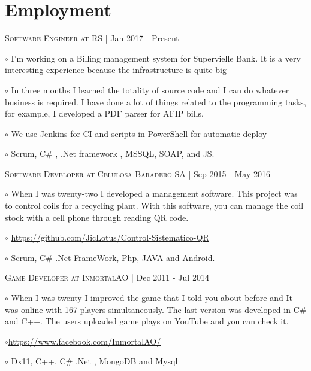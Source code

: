 \documentclass[letterpaper]{article}
\renewenvironment{itemize}{
  \begin{list}{}{
    \setlength{\leftmargin}{1.5em}
  }
}{
  \end{list}
}
\newenvironment{no-indent-itemize}{
  \begin{list}{}{
    \setlength{\leftmargin}{0em}
  }
}{
  \end{list}
}
\def\bullet{$\circ$\xspace}
\begin{document}
\section*{Employment}
\begin{no-indent-itemize}

    \item\textsc{Software Engineer at RS} | Jan 2017 - Present
    \begin{itemize}
    \item\bullet I'm working on a Billing management system for Supervielle Bank. It is a very interesting experience because the infrastructure is quite big
    \item\bullet In three months I learned the totality of source code and I can do whatever business is required. I have done a lot of things related to the programming tasks, for example, I developed a PDF parser for AFIP bills.
    \item\bullet We use Jenkins for CI and scripts in PowerShell for automatic deploy
    \item\bullet  Scrum, C\# , .Net framework , MSSQL, SOAP, and JS.
    \end{itemize}


    \item \textsc{Software Developer at Celulosa Baradero SA} | Sep 2015 - May 2016
    \begin{itemize}
    \item\bullet  When I was twenty-two I developed a management software. This project was to control coils for a recycling plant. With this software, you can manage the coil stock with a cell phone through reading QR code.
    \item\bullet
    \href{https://github.com/JicLotus/Control-Sistematico-QR}{https://github.com/JicLotus/Control-Sistematico-QR}
    \item\bullet Scrum, C\# .Net FrameWork, Php, JAVA and Android.
    \end{itemize}
    
    
    \item\textsc{Game Developer at InmortalAO} | Dec 2011 - Jul 2014
    \begin{itemize} 
    \item\bullet
    When I was twenty I improved the game that I told you about before and It was online with 167 players simultaneously. The last version was developed in C\# and C++. The users uploaded game plays on YouTube and you can check it.
    \item\bullet \href{https://www.facebook.com/InmortalAO/}{https://www.facebook.com/InmortalAO/}
    \item\bullet Dx11, C++, C\# .Net , MongoDB and Mysql
    \end{itemize}
    

\end{no-indent-itemize}
\end{document}
